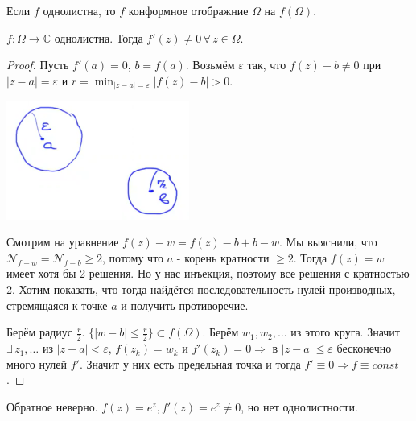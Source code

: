 \begin{consequence}
    Если $f$ однолистна, то $f$ конформное отображние $\Omega$ на $f(\Omega)$.
\end{consequence}

\begin{theorem}
    $f : \Omega \to \mathbb{C}$ однолистна. Тогда $f'(z) \neq 0 \, \forall \, z \in \Omega$.
\end{theorem}

\begin{proof}
    Пусть $f'(a) = 0$, $b = f(a)$. Возьмём $\varepsilon$ так, что
    $f(z) - b \neq 0$ при $|z - a| = \varepsilon$ и $r = \min_{|z - a| = \varepsilon} |f(z) - b| > 0$.

    \begin{center}
        \includegraphics[width=6cm]{assets/04-functions-of-complex-variables/single-leaf-theorem-derivative-none-zero.png}
    \end{center}

    Смотрим на уравнение $f(z) - w = f(z) - b + b - w$. Мы выяснили, что
    $\mathcal{N}_{f - w} = \mathcal{N}_{f - b} \geqslant 2$, потому что
    $a$ - корень кратности $\geqslant 2$. Тогда $f(z) = w$ имеет хотя бы 2 решения. Но у нас инъекция, поэтому
    все решения с кратностью 2. Хотим показать, что тогда найдётся последовательность нулей производных,
    стремящаяся к точке $a$ и получить противоречие.

    Берём радиус $\frac{r}{2}$. $\{ |w - b| \leqslant \frac{r}{2} \} \subset f(\Omega)$.
    Берём $w_1, w_2, \ldots$ из этого круга. Значит $\exists \, z_1, \ldots$ из $|z - a| < \varepsilon$,
    $f(z_k) = w_k$ и $f'(z_k) = 0 \Rightarrow$ в $|z - a| \leqslant \varepsilon$ бесконечно много нулей
    $f'$. Значит у них есть предельная точка и тогда $f' \equiv 0 \Rightarrow f \equiv const$.
\end{proof}

\begin{remark}
    Обратное неверно. $f(z) = e^z, f'(z) = e^z \neq 0$, но нет однолистности.
\end{remark}

